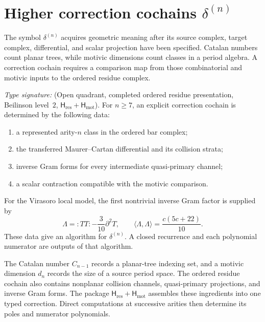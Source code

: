 \section{Higher correction cochains \(\delta^{(n)}\)}
\label{sec:nc-delta-n-higher-explicit}

The symbol \(\delta^{(n)}\) acquires geometric meaning after its source
complex, target complex, differential, and scalar projection have been
specified.  Catalan numbers count planar trees, while motivic
dimensions count classes in a period algebra.  A correction cochain
requires a comparison map from those combinatorial and motivic inputs
to the ordered residue complex.

\begin{proposition}
\label{prop:nc-delta-n-explicit-higher}
\ClaimStatusOpen
\emph{Type signature:}
\textup{(Open quadrant, completed ordered residue presentation,
Beilinson level~\(2\),
\(\mathsf H_{\mathrm{res}}+\mathsf H_{\mathrm{mot}}\)).}
For \(n\ge7\), an explicit correction cochain is determined by the
following data:
\begin{enumerate}[label=\textup{(D\arabic*)}]
\item a represented arity-\(n\) class in the ordered bar complex;
\item the transferred Maurer--Cartan differential and its collision
 strata;
\item inverse Gram forms for every intermediate quasi-primary channel;
\item a scalar contraction compatible with the motivic comparison.
\end{enumerate}
For the Virasoro local model, the first nontrivial inverse Gram factor
is supplied by
\[
 \Lambda={:}TT{:}-\frac{3}{10}\partial^2T,
 \qquad
 \langle\Lambda,\Lambda\rangle=\frac{c(5c+22)}{10}.
\]
These data give an algorithm for \(\delta^{(n)}\).  A closed recurrence
and each polynomial numerator are outputs of that algorithm.
\end{proposition}

\begin{remark}
\label{rem:nc-delta-n-beyond-leading}
The Catalan number \(C_{n-1}\) records a planar-tree indexing set, and
a motivic dimension \(d_n\) records the size of a source period space.
The ordered residue cochain also contains nonplanar collision channels,
quasi-primary projections, and inverse Gram forms.  The package
\(\mathsf H_{\mathrm{res}}+\mathsf H_{\mathrm{mot}}\) assembles these
ingredients into one typed correction.  Direct computations at
successive arities then determine its poles and numerator polynomials.
\end{remark}
